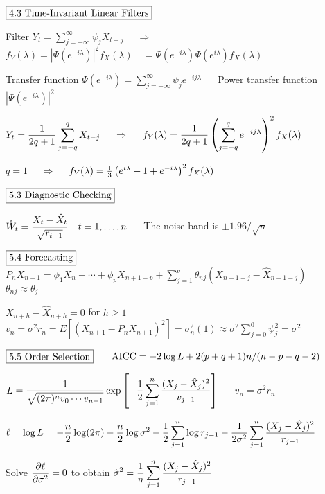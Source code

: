 \documentclass[12pt]{article}
\begin{document}
$\boxed{\hbox{4.3 Time-Invariant Linear Filters}}$

Filter $\displaystyle
Y_t=\sum_{j=-\infty}^\infty\psi_jX_{t-j}$
$\quad\Rightarrow\quad$
$f_Y(\lambda)=\left|\Psi\left(e^{-i\lambda}\right)\right|^2f_X(\lambda)
\quad=\Psi\left(e^{-i\lambda}\right)
\Psi\left(e^{i\lambda}\right)f_X(\lambda)$

Transfer function
$\displaystyle\Psi\left(e^{-i\lambda}\right)=\sum_{j=-\infty}^\infty
\psi_je^{-ij\lambda}$
$\quad$
Power transfer function
$\displaystyle\left|\Psi\left(e^{-i\lambda}\right)\right|^2$

$\displaystyle
Y_t={1\over2q+1}\sum_{j=-q}^qX_{t-j}$
$\quad\Rightarrow\quad$
$\displaystyle
f_Y(\lambda)={1\over2q+1}\left(
\sum_{j=-q}^qe^{-ij\lambda}\right)^2f_X(\lambda)$

$q=1$
$\quad\Rightarrow\quad$
$f_Y(\lambda)={1\over3}\left(e^{i\lambda}+1+e^{-i\lambda}\right)^2f_X(\lambda)$

\newpage


$\boxed{\hbox{5.3 Diagnostic Checking}}$

$\displaystyle
\hat W_t={X_t-\hat X_t\over\sqrt{r_{t-1}}}\quad t=1,\ldots,n$
$\quad$
The noise band is $\pm1.96/\sqrt{n}$





$\boxed{\hbox{5.4 Forecasting}}$
$\quad$
$\displaystyle
P_nX_{n+1}=\phi_1X_n+\cdots+\phi_pX_{n+1-p}
+\sum_{j=1}^q\theta_{nj}(X_{n+1-j}-\hat X_{n+1-j})$
$\quad$
$\theta_{nj}\approx\theta_j$

$X_{n+h}-\hat X_{n+h}=0$ for $h\ge1$
$\quad$
$\displaystyle
v_n=\sigma^2r_n=E[(X_{n+1}-P_nX_{n+1})^2]=
\sigma_n^2(1)\approx\sigma^2\sum_{j=0}^0\psi_j^2=\sigma^2$

$\boxed{\hbox{5.5 Order Selection}}$
$\quad$
${\rm AICC}=-2\log L+2(p+q+1)n/(n-p-q-2)$

$\displaystyle
L={1\over\sqrt{(2\pi)^nv_0\cdots v_{n-1}}}
\exp\left[
-{1\over2}\sum_{j=1}^n{(X_j-\hat X_j)^2\over v_{j-1}}\right]$
$\quad$
$v_n=\sigma^2r_n$

$\displaystyle
\ell=\log L=
-{n\over2}\log(2\pi)
-{n\over2}\log\sigma^2
-{1\over2}\sum_{j=1}^n\log r_{j-1}
-{1\over2\sigma^2}
\sum_{j=1}^n{(X_j-\hat X_j)^2\over r_{j-1}}$

Solve $\displaystyle{\partial\ell\over\partial\sigma^2}=0$
to obtain
$\displaystyle
\hat\sigma^2={1\over n}\sum_{j=1}^n{(X_j-\hat X_j)^2\over r_{j-1}}$
\end{document}
